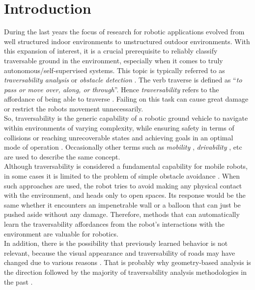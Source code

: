 \documentclass[12pt,a4paper]{report}
\newcommand{\defn}[1]{\enquote{\textit{#1}}}
\newcommand{\term}{\textit}
\begin{document}
	{
		\hypersetup{linkcolor=black}
		\tableofcontents
		\listoftables
		\listoffigures
	}
	
	\chapter{Introduction}
	\label{sec:intro}
	
	During the last years the focus of research for robotic applications evolved 
	from well structured indoor environments to unstructured outdoor environments. 
	With this expansion of interest, it is a crucial prerequisite to reliably 
	classify traversable ground in the environment, especially when it comes to 
	truly autonomous/self-supervised systems. This topic is typically referred to as 
	\term{traversability analysis} or \term{obstacle detection} \citep{Suger}. The 
	verb traverse is defined as \defn{to pass or move over, along, or through}. 
	Hence \term{traversability} refers to the affordance of being able to traverse 
	\citep{Ugur}. Failing on this task can cause great damage or restrict the robots 
	movement unnecessarily.
	\\
	
	So, traversability is the generic capability of a robotic ground 
	vehicle to navigate within environments of varying complexity, while ensuring 
	safety in terms of collisions or reaching unrecoverable states and achieving 
	goals in an optimal mode of operation \citep{Papadakis}. Occasionally other 
	terms such as \term{mobility} \citep{Lalonde}, \term{drivability} \citep{Droeschel}, 
	etc are used to describe the same concept.
	\\
	
	Although traversability is considered a fundamental capability for mobile 
	robots, in some cases it is limited to the problem of simple obstacle avoidance 
	\citep{Ugur}. When such approaches are used, the robot tries to avoid making any 
	physical contact with the environment, and heads only to open spaces. Its 
	response would be the same whether it encounters an impenetrable wall or a 
	balloon that can just be pushed aside without any damage. Therefore, methods 
	that can automatically learn the traversability affordances from the 
	robot’s interactions with the environment are valuable for robotics.
	\\
		
	In addition, there is the possibility that previously learned behavior is not 
	relevant, because the visual appearance and traversability of roads may 
	have changed due to various reasons \citep{Wigness}. That is probably why 
	geometry-based analysis is the direction followed by the majority of 
	traversability analysis methodologies in the past \citep{Papadakis}.
	\\
	
\end{document}
